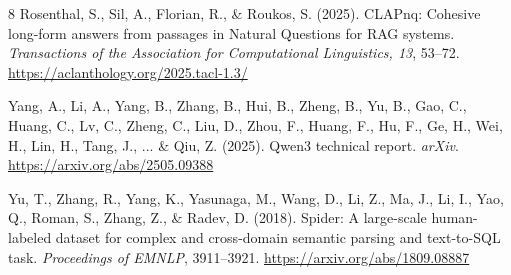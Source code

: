 \documentclass{article}
\begin{document}
\begin{thebibliography}{8}
Rosenthal, S., Sil, A., Florian, R., \& Roukos, S. (2025). CLAPnq: Cohesive long-form answers from
passages in Natural Questions for RAG systems. \emph{Transactions of the Association for
Computational Linguistics, 13}, 53--72.
\url{https://aclanthology.org/2025.tacl-1.3/}

Yang, A., Li, A., Yang, B., Zhang, B., Hui, B., Zheng, B., Yu, B., Gao, C., Huang, C., Lv, C.,
Zheng, C., Liu, D., Zhou, F., Huang, F., Hu, F., Ge, H., Wei, H., Lin, H., Tang, J., ... \& Qiu, Z.
(2025). Qwen3 technical report. \emph{arXiv}.
\url{https://arxiv.org/abs/2505.09388}

Yu, T., Zhang, R., Yang, K., Yasunaga, M., Wang, D., Li, Z., Ma, J., Li, I., Yao, Q., Roman, S.,
Zhang, Z., \& Radev, D. (2018). Spider: A large-scale human-labeled dataset for complex and
cross-domain semantic parsing and text-to-SQL task. \emph{Proceedings of EMNLP}, 3911--3921.
\url{https://arxiv.org/abs/1809.08887}

\end{thebibliography}
\end{document}
